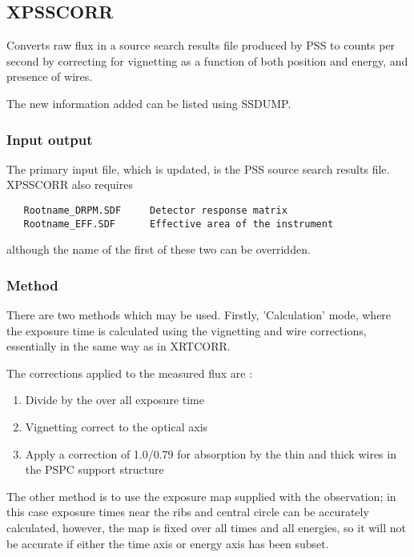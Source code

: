 \documentclass{book}
\renewcommand{\_}{{\tt\char'137}}     %
\begin{document}
\subsection{XPSSCORR}
Converts raw flux in a source search results file produced by PSS to
counts per second by correcting for vignetting as a function of both
position and energy, and presence of wires.

The new information added can be listed using SSDUMP.

\subsubsection{Input output}
The primary input file, which is updated, is the PSS source search
results file. XPSSCORR also requires

\begin{verbatim}
   Rootname_DRPM.SDF     Detector response matrix
   Rootname_EFF.SDF      Effective area of the instrument
\end{verbatim}
although the name of the first of these two can be overridden.

\subsubsection{Method}
There are two methods which may be used. Firstly, 'Calculation' mode,
where the exposure time is calculated using the vignetting and wire
corrections, essentially in the same way as in XRTCORR.

The corrections applied to the measured flux are :

\begin{enumerate}
\item Divide by the over all exposure time
\item Vignetting correct to the optical axis
\item Apply a correction of 1.0/0.79 for absorption by the
thin and thick wires in the PSPC support structure
\end{enumerate}
The other method is to use the exposure map supplied with
the observation; in this case exposure times near the ribs and
central circle can be accurately calculated, however, the map is fixed
over all times and all energies, so it will not be accurate if either
the time axis or energy axis has been subset.
\end{document}
